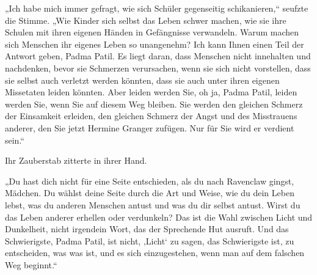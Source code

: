 „Ich habe mich immer gefragt, wie sich Schüler gegenseitig schikanieren,“ seufzte die Stimme. „Wie Kinder sich selbst das Leben schwer machen, wie sie ihre Schulen mit ihren eigenen Händen in Gefängnisse verwandeln. Warum machen sich Menschen ihr eigenes Leben so unangenehm? Ich kann Ihnen einen Teil der Antwort geben, Padma Patil. Es liegt daran, dass Menschen nicht innehalten und nachdenken, bevor sie Schmerzen verursachen, wenn sie sich nicht vorstellen, dass sie selbst auch verletzt werden könnten, dass sie auch unter ihren eigenen Missetaten leiden könnten. Aber leiden werden Sie, oh ja, Padma Patil, leiden werden Sie, wenn Sie auf diesem Weg bleiben. Sie werden den gleichen Schmerz der Einsamkeit erleiden, den gleichen Schmerz der Angst und des Misstrauens anderer, den Sie jetzt Hermine Granger zufügen. Nur für Sie wird er verdient sein.“

Ihr Zauberstab zitterte in ihrer Hand.

„Du hast dich nicht für eine Seite entschieden, als du nach Ravenclaw gingst, Mädchen. Du wählst deine Seite durch die Art und Weise, wie du dein Leben lebst, was du anderen Menschen antust und was du dir selbst antust. Wirst du das Leben anderer erhellen oder verdunkeln? Das ist die Wahl zwischen Licht und Dunkelheit, nicht irgendein Wort, das der Sprechende Hut ausruft. Und das Schwierigste, Padma Patil, ist nicht, ‚Licht‘ zu sagen, das Schwierigste ist, zu entscheiden, was was ist, und es sich einzugestehen, wenn man auf dem falschen Weg beginnt.“

